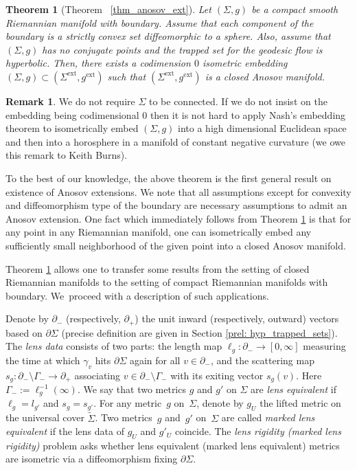 \documentclass[JEP,XML,SOM,Unicode,NoFloatCountersInSection]{cedram}
\newcommand{\ext}{\mathrm{ext}}
\newcommand{\elg}{\ell_g}
\newtheorem{thmintro}{Theorem}
\theoremstyle{definition}
\newtheorem*{remark*}{Remark}
\renewcommand{\>}{{\rangle}}
\newcommand{\<}{{\langle}}
\begin{document}
\begin{thmintro}[Theorem ~\ref{thm_anosov_ext}]\label{thm_anosov_intro}
Let $(\Sigma, g)$ be a compact smooth Riemannian manifold with boundary. Assume that each component of the boundary is a strictly convex set diffeomorphic to a sphere. Also, assume that $(\Sigma, g)$ has no conjugate points and the trapped set for the geodesic flow is hyperbolic. Then, there exists a codimension $0$ isometric embedding $(\Sigma,g)\subset (\Sigma^{\ext}, g^{\ext})$ such that $(\Sigma^{\ext}, g^{\ext})$ is a closed Anosov manifold.
\end{thmintro}
\begin{remark*}We do not require $\Sigma$ to be connected. If we do not insist on the embedding being codimensional $0$ then it is not hard to apply Nash's embedding theorem to isometrically embed $(\Sigma, g)$ into a high dimensional Euclidean space and then into a horosphere in a manifold of constant negative curvature (we owe this remark to Keith Burns).
\end{remark*}
To the best of our knowledge, the above theorem is the first general result on existence of Anosov extensions. We note that all assumptions except for convexity and diffeomorphism type of the boundary are necessary assumptions to admit an Anosov extension. One fact which immediately follows from Theorem \ref{thm_anosov_intro} is that for any point in any Riemannian manifold, one can isometrically embed any sufficiently small neighborhood of the given point into a closed Anosov manifold.

Theorem \ref{thm_anosov_intro} allows one to transfer some results from the setting of closed Riemannian manifolds to the setting of compact Riemannian manifolds with boundary. We~proceed with a description of such applications.

Denote by $\partial_-$ (respectively, $\partial_+$) the unit inward (respectively, outward) vectors based on $\partial \Sigma$ (precise definition are given in Section \ref{prel: hyp_trapped_sets}). The {\it lens data} consists of two parts: the length map $\elg: \partial_-\to [0,\infty]$ measuring the time at which $\gamma_v$ hits $\partial\Sigma$ again for all $v\in\partial_-$, and the scattering map $s_g: \partial_-\setminus\Gamma_-\to \partial_+$ associating $v\in \partial_-\setminus\Gamma_-$ with its exiting vector $s_g(v)$. Here $\Gamma_-:=\elg^{-1}(\infty)$. We say that two metrics $g$ and $g'$ on $\Sigma$ are \textit{lens equivalent} if $\elg=l_{g'}$ and $s_g=s_{g'}$. For any metric~$g$ on~$\Sigma$, denote by $g_U$ the lifted metric on the universal cover $\tilde{\Sigma}$. Two metrics~$g$ and~$g'$ on~$\Sigma$ are called \textit{marked lens equivalent} if the lens data of $g_U$ and $g'_U$ coincide. The \textit{lens rigidity (\resp marked lens rigidity)} problem asks whether lens equivalent (\resp marked lens equivalent) metrics are isometric via a diffeomorphism fixing $\partial \Sigma$.
\end{document}
